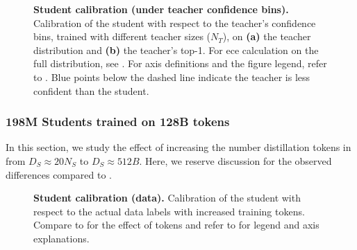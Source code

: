 \begin{figure}[h]
	\centering
	\hfill
	\caption{\textbf{Student calibration (under teacher confidence bins).} Calibration of the student with respect to the teacher's confidence bins, trained with different teacher sizes ($N_T$), on \textbf{(a)} the teacher distribution and \textbf{(b)} the teacher's top-1. For \gls{ece} calculation on the full distribution, see . For axis definitions and the figure legend, refer to . Blue points below the dashed line indicate the teacher is less confident than the student.}
	\label{fig:calibration-teacher-tdist-20n}
\end{figure}


\FloatBarrier
\subsubsection{198M Students trained on 128B tokens}
\label{sssec:198m-students-trained-on-128b-tokens}
In this section, we study the effect of increasing the number distillation tokens 
in  from $D_S\approx 20N_S$ to $D_S\approx 512B$.
Here, we reserve discussion for the observed differences compared to .

\begin{figure}[h]
  \centering
  \vspace{-0.1cm}
  \hfill
  \vspace{-0.1cm}
  \caption{\textbf{Student calibration (data).} Calibration of the student with respect to the actual data labels with increased training tokens. Compare to  for the effect of tokens and refer to  for legend and axis explanations.}
  \label{fig:calibration-student-data-128b}
  \vspace{-0.1cm}
\end{figure}

